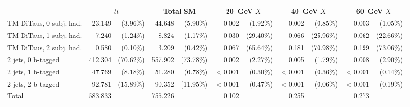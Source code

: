 \begin{tabular}{lrrrrrrrrrr}
\toprule
                        & \multicolumn{2}{c}{$t\bar{t}$} & \multicolumn{2}{c}{Total SM} & \multicolumn{2}{c}{\SI{20}{\GeV} $X$} & \multicolumn{2}{c}{\SI{40}{\GeV} $X$} & \multicolumn{2}{c}{\SI{60}{\GeV} $X$} \\
\midrule
TM DiTaus, 0 subj. had. & 23.149        & (3.96\%)       & 44.648       & (5.90\%)      & 0.002             & (1.92\%)          & 0.002             & (0.85\%)          & 0.003             & (1.05\%)          \\
TM DiTaus, 1 subj. had. & 7.240         & (1.24\%)       & 8.824        & (1.17\%)      & 0.030             & (29.40\%)         & 0.066             & (25.96\%)         & 0.062             & (22.66\%)         \\
TM DiTaus, 2 subj. had. & 0.580         & (0.10\%)       & 3.209        & (0.42\%)      & 0.067             & (65.64\%)         & 0.181             & (70.98\%)         & 0.199             & (73.06\%)         \\
2 jets, 0 b-tagged      & 412.304       & (70.62\%)      & 557.902      & (73.78\%)     & 0.002             & (2.27\%)          & 0.005             & (1.79\%)          & 0.008             & (2.90\%)          \\
2 jets, 1 b-tagged      & 47.769        & (8.18\%)       & 51.280       & (6.78\%)      & $< 0.001$         & (0.30\%)          & $< 0.001$         & (0.36\%)          & $< 0.001$         & (0.14\%)          \\
2 jets, 2 b-tagged      & 92.781        & (15.89\%)      & 90.352       & (11.95\%)     & $< 0.001$         & (0.47\%)          & $< 0.001$         & (0.06\%)          & $< 0.001$         & (0.19\%)          \\
Total                   & 583.833       &                & 756.226      &               & 0.102             &                   & 0.255             &                   & 0.273             &                   \\
\bottomrule
\end{tabular}